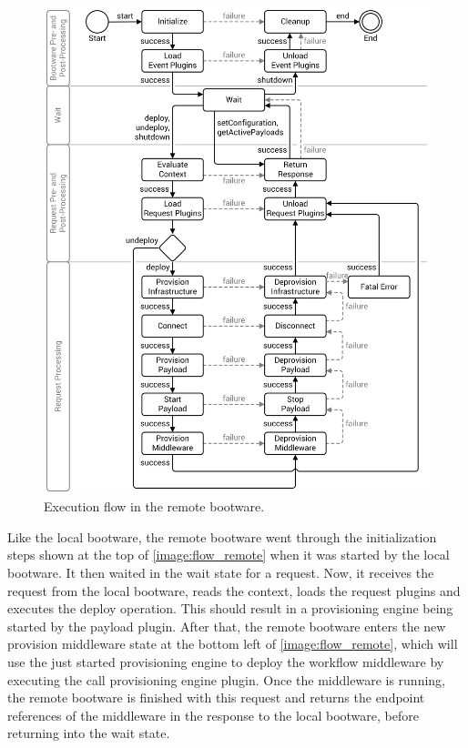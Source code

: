 \begin{figure}[!htbp]
	\centering
	\includegraphics[resolution=600]{design/assets/flow_remote}
	\caption{Execution flow in the remote bootware.}
	\label{image:flow_remote}
\end{figure}

Like the local bootware, the remote bootware went through the initialization steps shown at the top of \autoref{image:flow_remote} when it was started by the local bootware.
It then waited in the wait state for a request.
Now, it receives the request from the local bootware, reads the context, loads the request plugins and executes the deploy operation.
This should result in a provisioning engine being started by the payload plugin.
After that, the remote bootware enters the new provision middleware state at the bottom left of \autoref{image:flow_remote}, which will use the just started provisioning engine to deploy the workflow middleware by executing the call provisioning engine plugin.
Once the middleware is running, the remote bootware is finished with this request and returns the endpoint references of the middleware in the response to the local bootware, before returning into the wait state.

